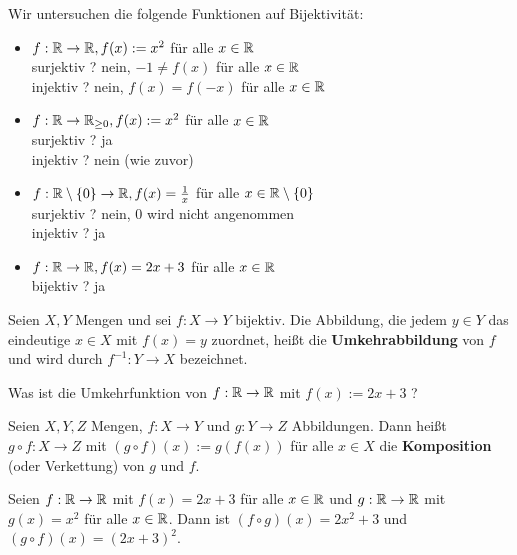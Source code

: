 \begin{bsp}
	Wir untersuchen die folgende Funktionen auf Bijektivität:\\[-2em]
	\begin{itemize}
		\item $ f : \mathbb{R} \to \mathbb{R}, f(x) := x^2 $
		für alle $ x \in \mathbb{R} $\\
		surjektiv ? nein, $ -1 \neq f(x) $ für alle $ x \in \mathbb{R} $\\
		injektiv ? nein, $ f(x) = f(-x) $ für alle $ x \in \mathbb{R} $
		\item $ f : \mathbb{R} \to \mathbb{R}_{\geq 0}, f(x) := x^2 $ für alle $ x \in \mathbb{R} $\\
		surjektiv ? ja\\
		injektiv ? nein (wie zuvor)
		\item $ f : \mathbb{R} \setminus \{ 0 \} \to \mathbb{R}, f(x) = \frac{1}{x} $ für alle $ x \in \mathbb{R} \setminus \{ 0 \}$\\
		surjektiv ? nein, 0 wird nicht angenommen\\
		injektiv ? ja
		\item $ f : \mathbb{R} \to \mathbb{R}, f(x) = 2x + 3 $ für alle $ x \in \mathbb{R} $\\
		bijektiv ? ja
	\end{itemize}
\end{bsp}


\begin{defn} 
Seien $ X,Y $ Mengen und sei $ f : X \to Y $ bijektiv. Die Abbildung, die jedem $ y \in Y $ das eindeutige $ x \in X $ mit $ f(x) = y $ zuordnet, heißt die \textbf{Umkehrabbildung} von $ f $ und wird durch $ f^{-1} : Y \to X $ bezeichnet.
\end{defn} 

\begin{aufg}
	Was ist die Umkehrfunktion von $ f : \mathbb{R} \to \mathbb{R}$ mit $ f(x) := 2x + 3 $ ?
\end{aufg}


\begin{defn}
Seien $ X,Y,Z $ Mengen, $ f : X \to Y $ und $ g : Y \to Z $ Abbildungen. Dann heißt $ g \circ f : X \to Z $ mit $ ( g \circ f )(x) := g( f(x) ) $ für alle $ x \in X $ die \textbf{Komposition} (oder Verkettung) von $ g $ und $ f $.
\end{defn}

\begin{bsp}
	Seien $ f : \mathbb{R} \to \mathbb{R}$ mit $ f(x) = 2x + 3 $ für alle $ x \in \mathbb{R} $ und $ g : \mathbb{R} \to \mathbb{R} $ mit $g(x) = x^2 $ für alle $ x \in \mathbb{R} $. Dann ist $ ( f \circ g )(x) = 2x^2 + 3 $ und $ ( g \circ f )(x) = (2x + 3)^2 $.
\end{bsp}


